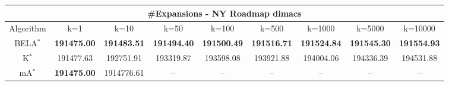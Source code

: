 \begin{tabular}{c|cccccccc}\toprule
\multicolumn{9}{c}{#Expansions - NY Roadmap dimacs}\\ \midrule
Algorithm & k=1 & k=10 & k=50 & k=100 & k=500 & k=1000 & k=5000 & k=10000 \\ \midrule
BELA$^*$ & \textbf{191475.00} & \textbf{191483.51} & \textbf{191494.40} & \textbf{191500.49} & \textbf{191516.71} & \textbf{191524.84} & \textbf{191545.30} & \textbf{191554.93} \\
K$^*$ & 191477.63 & 192751.91 & 193319.87 & 193598.08 & 193921.88 & 194004.06 & 194336.39 & 194531.88 \\
mA$^*$ & \textbf{191475.00} & 1914776.61 & -- & -- & -- & -- & -- & -- \\ \bottomrule 
\end{tabular}
